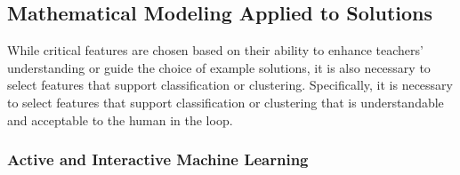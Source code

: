 
\subsection{Mathematical Modeling Applied to Solutions}

While critical features are chosen based on their ability to enhance teachers' understanding or guide the choice of example solutions, it is also necessary to select features that support classification or clustering. Specifically, it is necessary to select features that support classification or clustering that is understandable and acceptable to the human in the loop.

%
%
%

\subsubsection{Active and Interactive Machine Learning}


